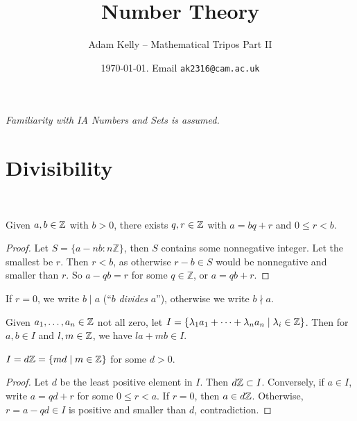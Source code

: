 \documentclass[a4paper, 10pt, twocolumn]{amsart}
\title{Number Theory}
\author{Adam Kelly -- Mathematical Tripos Part II}
\date{\today. Email \texttt{ak2316@cam.ac.uk}}
\begin{document}
\maketitle

\begin{center}
\emph{Familiarity with IA Numbers and Sets is assumed.}
\end{center}

\section{Divisibility}
\ 



\begin{theorem}
    Given $a, b \in \mathbb{Z}$ with $b > 0$, there exists $q, r \in \mathbb{Z}$ with $a = bq + r$ and $0 \leq r < b$.
\end{theorem}
\begin{proof}
  Let $S=\{a-n b: n \mathbb{Z}\}$, then $S$ contains some nonnegative integer. Let the smallest be $r$. Then $r<b$, as otherwise $r-b \in S$ would be nonnegative and smaller than $r$. So $a-q b=r$ for some $q \in \mathbb{Z}$, or $a=q b+r$.
\end{proof}

\begin{definition}
  If $r = 0$, we write $b \mid a$ (``$b$ \emph{divides} $a$''), otherwise we write $b \nmid a$.
\end{definition}

Given $a_1, \dots, a_n \in \mathbb{Z}$ not all zero, let $I = \{\lambda_1 a_1 + \cdots + \lambda_n a_n \mid \lambda_i \in \mathbb{Z}\}$. Then for $a, b \in I$ and $l, m \in \mathbb{Z}$, we have $la + mb \in I$.

\begin{lemma}
  $I = d \mathbb{Z} = \{md \mid m \in \mathbb{Z}\}$ for some $d > 0$.
\end{lemma}
\begin{proof}
  Let $d$ be the least positive element in $I$. Then $d\mathbb{Z} \subset I$. Conversely, if $a \in I$, write $a = qd + r$ for some $0 \leq r < a$. If $r = 0$, then $a \in d \mathbb{Z}$. Otherwise, $r = a - qd \in I$ is positive and smaller than $d$, contradiction.
\end{proof}
\end{document}
